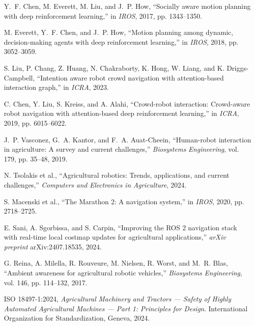 \documentclass[12pt,a4paper,oneside]{book}
\begin{document}
\begin{enumerate}[label={[\arabic*]}, leftmargin=*]
\item \label{Chen2019} Y.~F. Chen, M. Everett, M. Liu, and J.~P. How, ``Socially aware motion planning with deep reinforcement learning,'' in \emph{IROS}, 2017, pp. 1343--1350.

\item \label{Everett2018} M. Everett, Y.~F. Chen, and J.~P. How, ``Motion planning among dynamic, decision-making agents with deep reinforcement learning,'' in \emph{IROS}, 2018, pp. 3052--3059.

\item \label{Liu2023} S. Liu, P. Chang, Z. Huang, N. Chakraborty, K. Hong, W. Liang, and K. Driggs-Campbell, ``Intention aware robot crowd navigation with attention-based interaction graph,'' in \emph{ICRA}, 2023.

\item \label{Chen2023} C. Chen, Y. Liu, S. Kreiss, and A. Alahi, ``Crowd-robot interaction: Crowd-aware robot navigation with attention-based deep reinforcement learning,'' in \emph{ICRA}, 2019, pp. 6015--6022.

\item \label{Vasconez2019} J.~P. Vasconez, G.~A. Kantor, and F.~A. Auat-Cheein, ``Human-robot interaction in agriculture: A survey and current challenges,'' \emph{Biosystems Engineering}, vol. 179, pp. 35--48, 2019.

\item \label{Tsolakis2024} N. Tsolakis et al., ``Agricultural robotics: Trends, applications, and current challenges,'' \emph{Computers and Electronics in Agriculture}, 2024.

\item \label{Macenski2020} S. Macenski et al., ``The Marathon 2: A navigation system,'' in \emph{IROS}, 2020, pp. 2718--2725.

\item \label{Sani2024} E. Sani, A. Sgorbissa, and S. Carpin, ``Improving the ROS 2 navigation stack with real-time local costmap updates for agricultural applications,'' \emph{arXiv preprint} arXiv:2407.18535, 2024.

\item \label{Reina2017} G. Reina, A. Milella, R. Rouveure, M. Nielsen, R. Worst, and M.~R. Blas, ``Ambient awareness for agricultural robotic vehicles,'' \emph{Biosystems Engineering}, vol. 146, pp. 114--132, 2017.

\item \label{ISO18497} ISO 18497-1:2024, \emph{Agricultural Machinery and Tractors --- Safety of Highly Automated Agricultural Machines --- Part 1: Principles for Design}. International Organization for Standardization, Geneva, 2024.


\end{enumerate}
\end{document}
